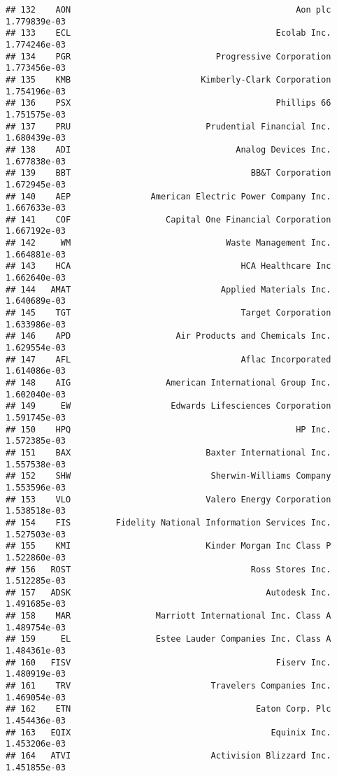\documentclass[
]{article}
\begin{document}
\begin{verbatim}
## 132    AON                                             Aon plc 1.779839e-03
## 133    ECL                                         Ecolab Inc. 1.774246e-03
## 134    PGR                             Progressive Corporation 1.773456e-03
## 135    KMB                          Kimberly-Clark Corporation 1.754196e-03
## 136    PSX                                         Phillips 66 1.751575e-03
## 137    PRU                           Prudential Financial Inc. 1.680439e-03
## 138    ADI                                 Analog Devices Inc. 1.677838e-03
## 139    BBT                                    BB&T Corporation 1.672945e-03
## 140    AEP                American Electric Power Company Inc. 1.667633e-03
## 141    COF                   Capital One Financial Corporation 1.667192e-03
## 142     WM                               Waste Management Inc. 1.664881e-03
## 143    HCA                                  HCA Healthcare Inc 1.662640e-03
## 144   AMAT                              Applied Materials Inc. 1.640689e-03
## 145    TGT                                  Target Corporation 1.633986e-03
## 146    APD                     Air Products and Chemicals Inc. 1.629554e-03
## 147    AFL                                  Aflac Incorporated 1.614086e-03
## 148    AIG                   American International Group Inc. 1.602040e-03
## 149     EW                    Edwards Lifesciences Corporation 1.591745e-03
## 150    HPQ                                             HP Inc. 1.572385e-03
## 151    BAX                           Baxter International Inc. 1.557538e-03
## 152    SHW                            Sherwin-Williams Company 1.553596e-03
## 153    VLO                           Valero Energy Corporation 1.538518e-03
## 154    FIS         Fidelity National Information Services Inc. 1.527503e-03
## 155    KMI                           Kinder Morgan Inc Class P 1.522860e-03
## 156   ROST                                    Ross Stores Inc. 1.512285e-03
## 157   ADSK                                       Autodesk Inc. 1.491685e-03
## 158    MAR                 Marriott International Inc. Class A 1.489754e-03
## 159     EL                 Estee Lauder Companies Inc. Class A 1.484361e-03
## 160   FISV                                         Fiserv Inc. 1.480919e-03
## 161    TRV                            Travelers Companies Inc. 1.469054e-03
## 162    ETN                                     Eaton Corp. Plc 1.454436e-03
## 163   EQIX                                        Equinix Inc. 1.453206e-03
## 164   ATVI                            Activision Blizzard Inc. 1.451855e-03

\end{verbatim}
\end{document}
